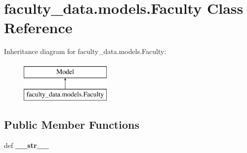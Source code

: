 \hypertarget{classfaculty__data_1_1models_1_1_faculty}{\section{faculty\-\_\-data.\-models.\-Faculty Class Reference}
\label{classfaculty__data_1_1models_1_1_faculty}
}
Inheritance diagram for faculty\-\_\-data.\-models.\-Faculty\-:\begin{figure}[H]
\begin{center}
\leavevmode
\includegraphics[height=2.000000cm]{classfaculty__data_1_1models_1_1_faculty}
\end{center}
\end{figure}
\subsection*{Public Member Functions}
\begin{DoxyCompactItemize}
\item 
\hypertarget{classfaculty__data_1_1models_1_1_faculty_a5441473cdbd137a5d97eaeee446ff2f8}{def {\bfseries \-\_\-\-\_\-str\-\_\-\-\_\-}}\label{classfaculty__data_1_1models_1_1_faculty_a5441473cdbd137a5d97eaeee446ff2f8}

\end{DoxyCompactItemize}
